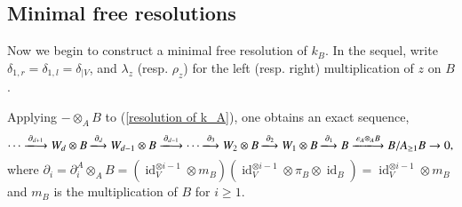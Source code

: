 \documentclass[a4paper,10pt]{amsart}
\theoremstyle{definition}
\numberwithin{equation}{section}
\DeclareMathOperator{\id}{id}
\begin{document}


\subsection{Minimal free resolutions}

Now we begin to construct a minimal free resolution of $k_B$. In the sequel, write $\delta_{1,r}=\delta_{1,l}=\delta_{|V}$, and  $\lambda_z$ (resp. $\rho_z$) for the left (resp. right) multiplication of $z$ on $B$.

Applying $-\otimes_AB$ to (\ref{resolution of k_A}), one obtains an exact sequence,
$$
\cdots\xlongrightarrow{\partial_{d+1}} W_d\otimes B\xlongrightarrow{\partial_d}W_{d-1}\otimes B\xlongrightarrow{\partial_{d-1}}\cdots\xlongrightarrow{\partial_{3}}W_2\otimes B\xlongrightarrow{\partial_{2}}W_1\otimes B\xlongrightarrow{\partial_{1}}B\xlongrightarrow{\varepsilon_A\otimes_AB}B/A_{\geq1}B\to0,
$$
where $\partial_{i}=\partial^A_{i}\otimes_AB=(\id_V^{\otimes i-1}\otimes m_B)(\id_V^{\otimes i-1}\otimes\pi_B\otimes\id_B)=\id_V^{\otimes i-1}\otimes m_B$ and $m_B$ is the multiplication of $B$ for $i\geq1$.
\end{document}
